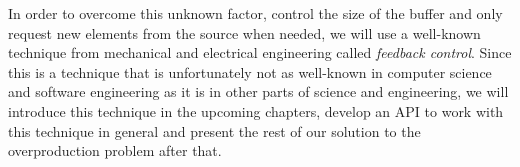 In order to overcome this unknown factor, control the size of the buffer and only request new elements from the source when needed, we will use a well-known technique from mechanical and electrical engineering called \textit{feedback control}. Since this is a technique that is unfortunately not as well-known in computer science and software engineering as it is in other parts of science and engineering, we will introduce this technique in the upcoming chapters, develop an API to work with this technique in general and present the rest of our solution to the overproduction problem after that.
